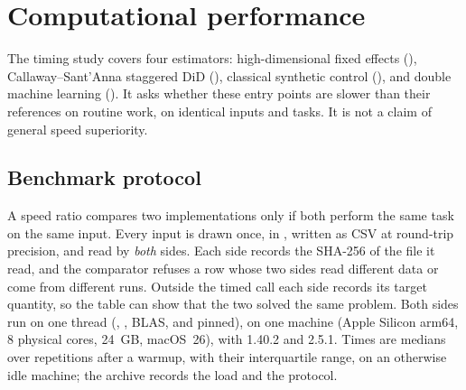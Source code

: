 \section{Computational performance}\label{sec:performance}

The timing study covers four estimators: high-dimensional fixed effects
(), Callaway--Sant'Anna staggered DiD
(), classical synthetic control
(), and double machine learning
(). It asks whether these entry points are slower than their references on
routine work, on identical inputs and tasks. It is not a claim of general speed
superiority.

\subsection{Benchmark protocol}

A speed ratio compares two implementations only if both perform the same
task on the same input. Every input is drawn once, in ,
written as CSV at round-trip precision, and read by \emph{both} sides. Each
side records the SHA-256 of the file it read, and the comparator refuses a
row whose two sides read different data or come from different runs. Outside the timed call each side records its target
quantity, so the table can show that the two solved the same problem. Both
sides run on one thread (, 
\citep{barrett2026datatable}, BLAS, and  pinned), on one machine
(Apple Silicon arm64, 8 physical cores, 24~GB, macOS~26), with \statspai{}
1.40.2 and  2.5.1. Times are medians over repetitions after a
warmup, with their interquartile range, on an otherwise idle machine; the
archive records the load and the protocol.

